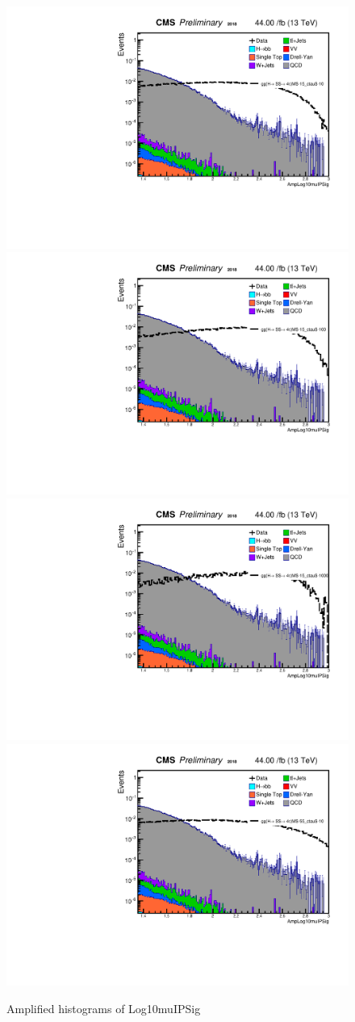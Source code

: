  \begin{figure}[h!]
   \caption{Amplified histograms of Log10muIPSig}
   \label{fig:AmpleadmuIP}
   \centering
   \includegraphics[width=0.47\linewidth]{figs/log_Oct6ANVars_MS-15_ctauS-10_AmpLog10muIPSig.pdf}
   \includegraphics[width=0.47\linewidth]{figs/log_Oct6ANVars_MS-15_ctauS-100_AmpLog10muIPSig.pdf}
   \includegraphics[width=0.47\linewidth]{figs/log_Oct6ANVars_MS-15_ctauS-1000_AmpLog10muIPSig.pdf}
   \includegraphics[width=0.47\linewidth]{figs/log_Oct6ANVars_MS-55_ctauS-10_AmpLog10muIPSig.pdf}
 \end{figure}

